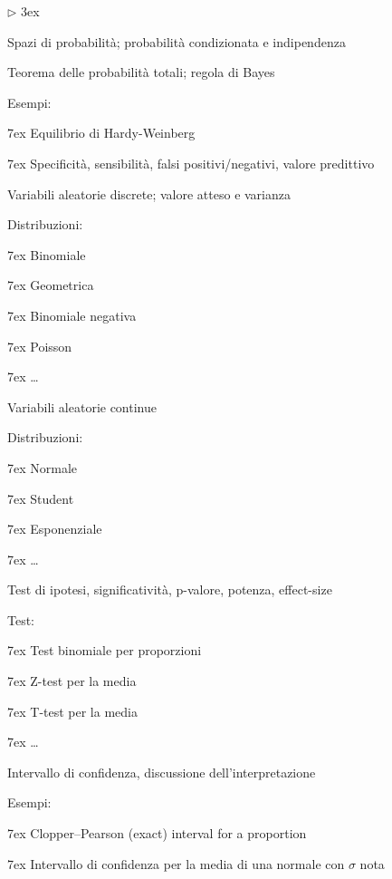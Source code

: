 \documentclass[10pt]{article}
\newcommand{\mylabel}[1]{#1\hfill}
\renewenvironment{itemize}
  {\begin{list}{$\triangleright$}{%
   \baselineskip3ex
   \setlength{\parskip}{4mm}
   \setlength{\topsep}{.4\baselineskip}
   \setlength{\rightmargin}{0mm}
   \setlength{\listparindent}{0mm}
   \setlength{\itemindent}{0mm}
   \setlength{\labelwidth}{2ex}
   \setlength{\itemsep}{.4\baselineskip}
   \setlength{\parsep}{0mm}
   \setlength{\partopsep}{0mm}
   \setlength{\labelsep}{1ex}
   \setlength{\leftmargin}{\labelwidth+\labelsep}
   \let\makelabel\mylabel}}{%
   \end{list}\vspace*{-1.3mm}}
\begin{document}
\begin{itemize}
\item Spazi di probabilità; probabilità condizionata e indipendenza

\item Teorema delle probabilità totali; regola di Bayes

Esempi:
    
    \noindent\kern7ex Equilibrio di Hardy-Weinberg
    
    \noindent\kern7ex Specificità, sensibilità, falsi positivi/negativi, valore predittivo
    
\item Variabili aleatorie discrete; valore atteso e varianza

Distribuzioni:
  
  \noindent\kern7ex Binomiale
  
  \noindent\kern7ex Geometrica
  
  \noindent\kern7ex Binomiale negativa
  
  \noindent\kern7ex Poisson

  \noindent\kern7ex \ldots\hfill{} 
  
\item Variabili aleatorie continue

Distribuzioni:
  
  \noindent\kern7ex Normale
  
  \noindent\kern7ex Student
  
  \noindent\kern7ex Esponenziale

  \noindent\kern7ex \ldots\hfill{} 
  
\item Test di ipotesi, significatività, p-valore, potenza, effect-size

Test:
  
  \noindent\kern7ex Test binomiale per proporzioni
  
  \noindent\kern7ex Z-test per la media
  
  \noindent\kern7ex T-test per la media

  \noindent\kern7ex \ldots\hfill{} 
  
\item Intervallo di confidenza, discussione dell'interpretazione

Esempi:
  
  \noindent\kern7ex Clopper–Pearson (exact) interval for a proportion
  
  \noindent\kern7ex Intervallo di confidenza per la media di una normale con $\sigma$ nota
  

\end{itemize}
\end{document}
